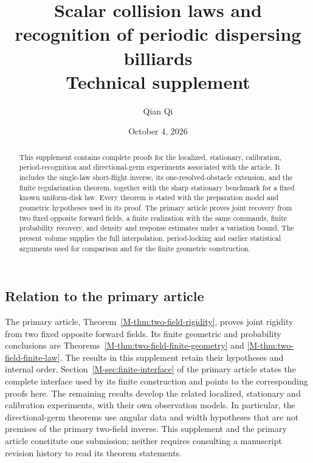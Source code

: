 \documentclass[11pt]{amsart}
\title[Scalar collision laws: supplement]{Scalar collision laws and recognition of periodic dispersing billiards\\ Technical supplement}
\author{Qian Qi}
\date{October 4, 2026}
\begin{document}
\raggedbottom
\begin{abstract}
This supplement contains complete proofs for the localized,
stationary, calibration, period-recognition and directional-germ
experiments associated with the article. It includes the single-law
short-flight inverse, its one-resolved-obstacle extension, and the
finite regularization theorem, together with the sharp stationary
benchmark for a fixed known uniform-disk law. Every theorem is stated
with the preparation model and geometric hypotheses used in its proof.
The primary article proves joint recovery from two fixed opposite
forward fields, a finite realization with the same commands, finite
probability recovery, and density and response estimates under a
variation bound. The present volume supplies the full interpolation,
period-locking and earlier statistical arguments used for comparison
and for the finite geometric construction.
\end{abstract}
\maketitle
\subsection*{Relation to the primary article}
The primary article, Theorem~\ref{M-thm:two-field-rigidity}, proves
joint rigidity from two fixed opposite forward fields. Its finite
geometric and probability conclusions are
Theorems~\ref{M-thm:two-field-finite-geometry} and
\ref{M-thm:two-field-finite-law}. The results in this supplement retain
their hypotheses and internal order. Section~\ref{M-sec:finite-interface}
of the primary article states the complete interface used by its finite
construction and points to the corresponding proofs here. The remaining
results develop the related localized, stationary and calibration
experiments, with their own observation models. In particular, the
directional-germ theorems use angular data and width hypotheses that
are not premises of the primary two-field inverse. This supplement
and the primary article constitute one submission; neither requires
consulting a manuscript revision history to read its theorem statements.







\appendix

















\end{document}
